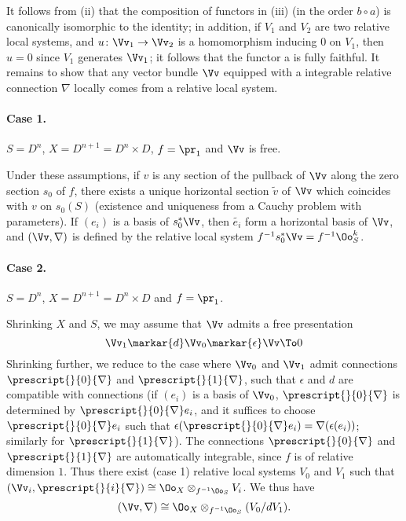 \begin{subpara}
  It follows from (ii) that the composition of functors in (iii)
  (in the order $b\circ a$) is canonically isomorphic to the identity;
  in addition, if $V_1$ and $V_2$ are two relative local systems, and
  $u\colon\Vv_1\to\Vv_2$ is a homomorphism inducing $0$ on $V_1$, then $u=0$
  since $V_1$ generates $\Vv_1$; it follows that the functor a is fully faithful.
  It remains to show that any vector bundle $\Vv$ equipped with a integrable
  relative connection $\nabla$ locally comes from a relative local system.

  \paragraph{Case 1.}
  $S=D^n$, $X=D^{n+1}=D^n\times D$, $f=\pr_1$ and $\Vv$ is free.

  Under these assumptions, if $v$ is any section of the pullback of $\Vv$ along
  the zero section $s_0$ of $f$, there exists a unique horizontal section
  $\widetilde{v}$ of $\Vv$ which coincides with $v$ on $s_0(S)$
  (existence and uniqueness from a Cauchy problem with parameters).
  If $(e_i)$ is a basis of $s_0^{\ast}\Vv$, then $\widetilde{e_i}$ form a
  horizontal basis of $\Vv$, and $(\Vv,\nabla)$ is defined by the relative
  local system $f^{-1}s_0^{\ast}\Vv=f^{-1}\Oo_S^k$.

  \paragraph{Case 2.}
  $S=D^n$, $X=D^{n+1}=D^n\times D$ and $f=\pr_1$.

  Shrinking $X$ and $S$, we may assume that $\Vv$ admits a free presentation
  \[
  \Vv_1\markar{d}\Vv_0\markar{\epsilon}\Vv\To0
  \]
  Shrinking further, we reduce to the case where $\Vv_0$ and $\Vv_1$ admit
  connections $\prescript{}{0}{\nabla}$ and $\prescript{}{1}{\nabla}$, such that
  $\epsilon$ and $d$ are compatible with connections
  (if $(e_i)$ is a basis of $\Vv_0$, $\prescript{}{0}{\nabla}$ is determined by
  $\prescript{}{0}{\nabla}e_i$, and it suffices to choose
  $\prescript{}{0}{\nabla}e_i$ such that
  $\epsilon(\prescript{}{0}{\nabla}e_i) = \nabla(\epsilon(e_i))$;
  similarly for $\prescript{}{1}{\nabla}$).
  The connections $\prescript{}{0}{\nabla}$ and $\prescript{}{1}{\nabla}$ are
  automatically integrable, since $f$ is of relative dimension $1$.
  Thus there exist (case 1) relative local systems $V_0$ and $V_1$ such that
  $(\Vv_i,\prescript{}{i}{\nabla})\cong\Oo_X\otimes_{f^{-1}\Oo_S}V_i$.
  We thus have
  \[
  (\Vv,\nabla) \cong \Oo_X\otimes_{f^{-1}\Oo_S}(V_0/dV_1).
  \]


\end{subpara}
